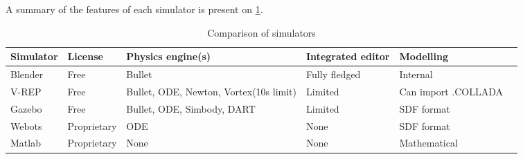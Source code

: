 A summary of the features of each simulator is present on \cref{table:simulators_comp}.

\begin{table}[htp]
\center
\begin{tabularx}{\textwidth}{@{} l l X X X X @{}}
\toprule
\textbf{Simulator} & \textbf{License} & \textbf{Physics engine(s)} & \textbf{Integrated editor} & \textbf{Modelling}\\ 
\midrule
Blender & Free & Bullet & Fully fledged & Internal\\ 

V-REP & Free & Bullet, ODE, Newton, Vortex(10s limit) & Limited & Can import .COLLADA\\

Gazebo & Free & Bullet, ODE, Simbody, DART & Limited & SDF format\\

Webots & Proprietary & ODE & None & SDF format\\

Matlab & Proprietary & None & None & Mathematical\\
\bottomrule
\end{tabularx}
\caption{Comparison of simulators}
\label{table:simulators_comp}
\end{table}

